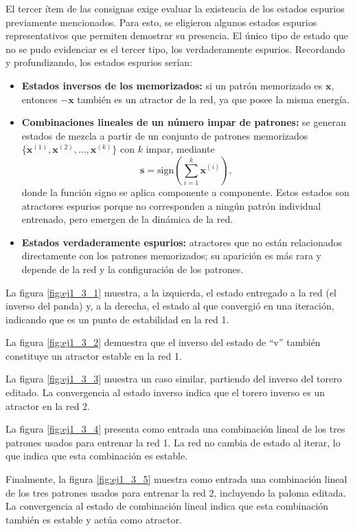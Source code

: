 \documentclass[11pt]{article} %
\begin{document}
\newpage 
El tercer ítem de las consignas exige evaluar la existencia de los estados espurios previamente mencionados. Para esto, se eligieron algunos estados espurios representativos que permiten demostrar su presencia. El único tipo de estado que no se pudo evidenciar es el tercer tipo, los verdaderamente espurios. Recordando y profundizando, los estados espurios serían:

\begin{itemize}
\item \textbf{Estados inversos de los memorizados:} si un patrón memorizado es $\mathbf{x}$, entonces $-\mathbf{x}$ también es un atractor de la red, ya que posee la misma energía.
\item \textbf{Combinaciones lineales de un número impar de patrones:} se generan estados de mezcla a partir de un conjunto de patrones memorizados $\{\mathbf{x}^{(1)}, \mathbf{x}^{(2)}, \dots, \mathbf{x}^{(k)}\}$ con $k$ impar, mediante
\[
\mathbf{s} = \mathrm{sign}\left(\sum_{i=1}^{k} \mathbf{x}^{(i)}\right),
\]
donde la función signo se aplica componente a componente. Estos estados son atractores espurios porque no corresponden a ningún patrón individual entrenado, pero emergen de la dinámica de la red.
\item \textbf{Estados verdaderamente espurios:} atractores que no están relacionados directamente con los patrones memorizados; su aparición es más rara y depende de la red y la configuración de los patrones.
\end{itemize}

La figura \ref{fig:ej1_3_1} muestra, a la izquierda, el estado entregado a la red (el inverso del panda) y, a la derecha, el estado al que convergió en una iteración, indicando que es un punto de estabilidad en la red 1.  

La figura \ref{fig:ej1_3_2} demuestra que el inverso del estado de ``v'' también constituye un atractor estable en la red 1.  

La figura \ref{fig:ej1_3_3} muestra un caso similar, partiendo del inverso del torero editado. La convergencia al estado inverso indica que el torero inverso es un atractor en la red 2.  

La figura \ref{fig:ej1_3_4} presenta como entrada una combinación lineal de los tres patrones usados para entrenar la red 1. La red no cambia de estado al iterar, lo que indica que esta combinación es estable.  

Finalmente, la figura \ref{fig:ej1_3_5} muestra como entrada una combinación lineal de los tres patrones usados para entrenar la red 2, incluyendo la paloma editada. La convergencia al estado de combinación lineal indica que esta combinación también es estable y actúa como atractor.
\end{document}
